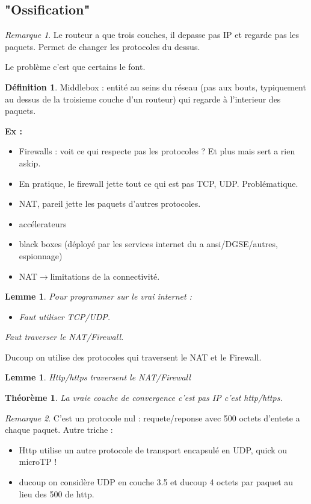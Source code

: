 \documentclass[12pt]{article}
\theoremstyle{plain}
\newtheorem{thm}[subsubsection]{Th\'eor\`eme}
\newtheorem{lem}[subsubsection]{Lemme}
\theoremstyle{definition}
\newtheorem{defn}[subsubsection]{D\'efinition}
\theoremstyle{remark}
\newtheorem{rem}{Remarque}
\begin{document}
\subsection{"Ossification"}
\begin{rem}
    Le routeur a que trois couches, il depasse pas IP et regarde pas les paquets. Permet de changer les protocoles du dessus.
\end{rem}

Le problème c'est que certains le font.
\begin{defn}
    Middlebox : entité au seins du réseau (pas aux bouts, typiquement au dessus de la troisieme couche d'un routeur) qui regarde à l'interieur des paquets.
\end{defn}

\textbf{Ex :} \begin{itemize}
    \item Firewalls : voit ce qui respecte pas les protocoles ? Et plus mais sert a rien askip. 
    \item En pratique, le firewall jette tout ce qui est pas TCP, UDP. Problématique.
    \item NAT, pareil jette les paquets d'autres protocoles.
    \item accélerateurs
    \item black boxes (déployé par les services internet du a ansi/DGSE/autres, espionnage)
    \item NAT$\rightarrow$limitations de la connectivité. 
\end{itemize}

\begin{lem}
    Pour programmer sur le vrai internet :
    \begin{itemize}
        \item Faut utiliser TCP/UDP.
    \end{itemize}
    Faut traverser le NAT/Firewall.
\end{lem}

Ducoup on utilise des protocoles qui traversent le NAT et le Firewall.
\begin{lem}
    Http/https traversent le NAT/Firewall
\end{lem}

\begin{thm}
    La vraie couche de convergence c'est pas IP c'est http/https.
\end{thm}

\begin{rem}
    C'est un protocole nul : requete/reponse avec 500 octets d'entete a chaque paquet. Autre triche :\begin{itemize}
        \item Http utilise un autre protocole de transport encapsulé en UDP, quick ou microTP !
        \item ducoup on considère UDP en couche 3.5 et ducoup 4 octets par paquet au lieu des 500 de http.
    \end{itemize}
\end{rem}
\end{document}

